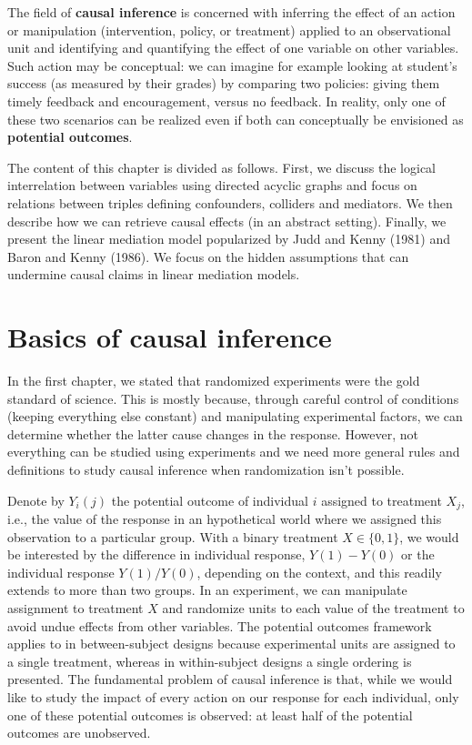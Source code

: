 \documentclass[
  11pt,
  letterpaper,
]{scrbook}
\theoremstyle{definition}
\theoremstyle{definition}
\theoremstyle{remark}
\begin{document}
The field of \textbf{causal inference} is concerned with inferring the
effect of an action or manipulation (intervention, policy, or treatment)
applied to an observational unit and identifying and quantifying the
effect of one variable on other variables. Such action may be
conceptual: we can imagine for example looking at student's success (as
measured by their grades) by comparing two policies: giving them timely
feedback and encouragement, versus no feedback. In reality, only one of
these two scenarios can be realized even if both can conceptually be
envisioned as \textbf{potential outcomes}.

The content of this chapter is divided as follows. First, we discuss the
logical interrelation between variables using directed acyclic graphs
and focus on relations between triples defining confounders, colliders
and mediators. We then describe how we can retrieve causal effects (in
an abstract setting). Finally, we present the linear mediation model
popularized by Judd and Kenny (1981) and Baron and Kenny (1986). We
focus on the hidden assumptions that can undermine causal claims in
linear mediation models.

\section{Basics of causal inference}\label{basics-of-causal-inference}

In the first chapter, we stated that randomized experiments were the
gold standard of science. This is mostly because, through careful
control of conditions (keeping everything else constant) and
manipulating experimental factors, we can determine whether the latter
cause changes in the response. However, not everything can be studied
using experiments and we need more general rules and definitions to
study causal inference when randomization isn't possible.

Denote by \(Y_i(j)\) the potential outcome of individual \(i\) assigned
to treatment \(X_j\), i.e., the value of the response in an hypothetical
world where we assigned this observation to a particular group. With a
binary treatment \(X \in \{0,1\}\), we would be interested by the
difference in individual response, \(Y(1)-Y(0)\) or the individual
response \(Y(1)/Y(0)\), depending on the context, and this readily
extends to more than two groups. In an experiment, we can manipulate
assignment to treatment \(X\) and randomize units to each value of the
treatment to avoid undue effects from other variables. The potential
outcomes framework applies to in between-subject designs because
experimental units are assigned to a single treatment, whereas in
within-subject designs a single ordering is presented. The fundamental
problem of causal inference is that, while we would like to study the
impact of every action on our response for each individual, only one of
these potential outcomes is observed: at least half of the potential
outcomes are unobserved.
\end{document}
